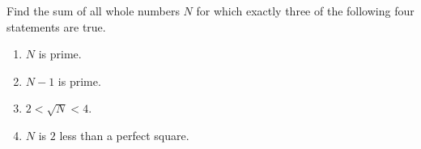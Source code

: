 Find the sum of all whole numbers $N$ for which exactly three of the following four statements are true.
\begin{enumerate}
\item[(1)] $N$ is prime.
\item[(2)] $N-1$ is prime.
\item[(3)] $2<\sqrt N<4$.
\item[(4)] $N$ is $2$ less than a perfect square.
\end{enumerate}
